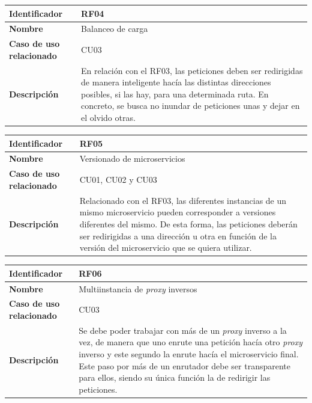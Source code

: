 \documentclass[11pt,spanish,listoffigures]{tfgetsinf}
\begin{document}
\begin{center} \begin{tabular}{| l | p{9.5cm} |}
\hline
\textbf{Identificador} & RF04
\\ \hline
\textbf{Nombre} & Balanceo de carga
\\ \hline
\textbf{Caso de uso relacionado} & CU03
\\ \hline
\textbf{Descripción} & En relación con el RF03, las peticiones deben ser redirigidas de manera inteligente hacía las distintas direcciones posibles, si las hay, para una determinada ruta. En concreto, se busca no inundar de peticiones unas y dejar en el olvido otras.
\\ \hline \end{tabular} \end{center}

\begin{center} \begin{tabular}{| l | p{9.5cm} |}
\hline
\textbf{Identificador} & RF05
\\ \hline
\textbf{Nombre} & Versionado de microservicios
\\ \hline
\textbf{Caso de uso relacionado} & CU01, CU02 y CU03
\\ \hline
\textbf{Descripción} & Relacionado con el RF03, las diferentes instancias de un mismo microservicio pueden corresponder a versiones diferentes del mismo. De esta forma, las peticiones deberán ser redirigidas a una dirección u otra en función de la versión del microservicio que se quiera utilizar.
\\ \hline \end{tabular} \end{center}

\begin{center} \begin{tabular}{| l | p{9.5cm} |}
\hline
\textbf{Identificador} & RF06
\\ \hline
\textbf{Nombre} & Multiinstancia de \emph{proxy} inversos
\\ \hline
\textbf{Caso de uso relacionado} & CU03
\\ \hline
\textbf{Descripción} & Se debe poder trabajar con más de un \emph{proxy} inverso a la vez, de manera que uno enrute una petición hacía otro \emph{proxy} inverso y este segundo la enrute hacía el microservicio final. Este paso por más de un enrutador debe ser transparente para ellos, siendo su única función la de redirigir las peticiones.
\\ \hline \end{tabular} \end{center}
\end{document}
